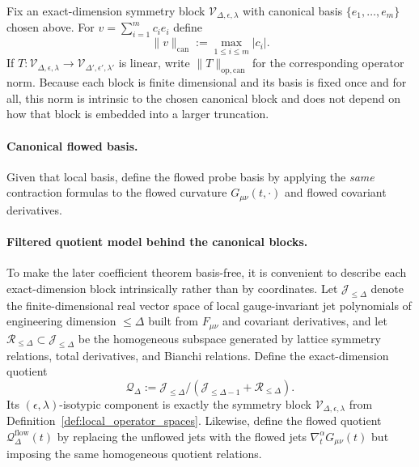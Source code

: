 \begin{definition}\label{def:LaneA_canonical_block_norm}
Fix an exact-dimension symmetry block $\mathscr V_{\Delta,\epsilon,\lambda}$ with canonical basis
$\{e_1,\dots,e_m\}$ chosen above.
For $v=\sum_{i=1}^m c_i e_i$ define
\[
\|v\|_{\mathrm{can}}:=\max_{1\le i\le m}|c_i|.
\]
If $T:\mathscr V_{\Delta,\epsilon,\lambda}\to\mathscr V_{\Delta',\epsilon',\lambda'}$ is linear, write
$\|T\|_{\mathrm{op,can}}$ for the corresponding operator norm.
Because each block is finite dimensional and its basis is fixed once and for all,
this norm is intrinsic to the chosen canonical block and does not depend on how that block is embedded into a larger truncation.
\end{definition}

\paragraph{Canonical flowed basis.}
Given that local basis, define the flowed probe basis by applying the \emph{same} contraction formulas to the flowed curvature
$G_{\mu\nu}(t,\cdot)$ and flowed covariant derivatives.

\paragraph{Filtered quotient model behind the canonical blocks.}
To make the later coefficient theorem basis-free, it is convenient to describe each exact-dimension block intrinsically rather than by coordinates.
Let $\mathscr J_{\le \Delta}$ denote the finite-dimensional real vector space of local gauge-invariant jet polynomials of engineering dimension $\le \Delta$
built from $F_{\mu\nu}$ and covariant derivatives, and let $\mathscr R_{\le \Delta}\subset \mathscr J_{\le \Delta}$ be the homogeneous subspace generated by
lattice symmetry relations, total derivatives, and Bianchi relations.
Define the exact-dimension quotient
\begin{equation}\label{eq:LaneA_exact_dim_quotient}
\mathscr Q_{\Delta}
:=
\mathscr J_{\le \Delta}/(\mathscr J_{\le \Delta-1}+\mathscr R_{\le \Delta}).
\end{equation}
Its $(\epsilon,\lambda)$-isotypic component is exactly the symmetry block $\mathscr V_{\Delta,\epsilon,\lambda}$ from Definition~\ref{def:local_operator_spaces}.
Likewise, define the flowed quotient $\mathscr Q^{\mathrm{flow}}_{\Delta}(t)$ by replacing the unflowed jets with the flowed jets $\nabla_t^{\alpha}G_{\mu\nu}(t)$ but imposing the same homogeneous quotient relations.

